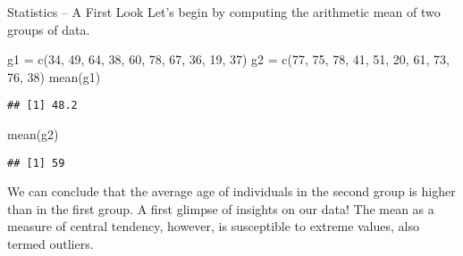 \documentclass[
  ignorenonframetext,
]{beamer}
\newenvironment{Shaded}{\begin{snugshade}}{\end{snugshade}}
\newcommand{\DecValTok}[1]{\textcolor[rgb]{0.00,0.00,0.81}{#1}}
\newcommand{\FunctionTok}[1]{\textcolor[rgb]{0.00,0.00,0.00}{#1}}
\newcommand{\NormalTok}[1]{#1}
\newcommand{\OtherTok}[1]{\textcolor[rgb]{0.56,0.35,0.01}{#1}}
\begin{document}
\begin{frame}[fragile]{Statistics -- A First Look}
\protect\hypertarget{statistics-a-first-look}{}
Let's begin by computing the arithmetic mean of two groups of data.

\begin{Shaded}
\begin{Highlighting}[]
\NormalTok{g1 }\OtherTok{=} \FunctionTok{c}\NormalTok{(}\DecValTok{34}\NormalTok{, }\DecValTok{49}\NormalTok{, }\DecValTok{64}\NormalTok{, }\DecValTok{38}\NormalTok{, }\DecValTok{60}\NormalTok{, }\DecValTok{78}\NormalTok{, }\DecValTok{67}\NormalTok{, }\DecValTok{36}\NormalTok{, }\DecValTok{19}\NormalTok{, }\DecValTok{37}\NormalTok{) }
\NormalTok{g2 }\OtherTok{=} \FunctionTok{c}\NormalTok{(}\DecValTok{77}\NormalTok{, }\DecValTok{75}\NormalTok{, }\DecValTok{78}\NormalTok{, }\DecValTok{41}\NormalTok{, }\DecValTok{51}\NormalTok{, }\DecValTok{20}\NormalTok{, }\DecValTok{61}\NormalTok{, }\DecValTok{73}\NormalTok{, }\DecValTok{76}\NormalTok{, }\DecValTok{38}\NormalTok{) }
\FunctionTok{mean}\NormalTok{(g1) }
\end{Highlighting}
\end{Shaded}

\begin{verbatim}
## [1] 48.2
\end{verbatim}

\begin{Shaded}
\begin{Highlighting}[]
\FunctionTok{mean}\NormalTok{(g2)}
\end{Highlighting}
\end{Shaded}

\begin{verbatim}
## [1] 59
\end{verbatim}

We can conclude that the average age of individuals in the second group
is higher than in the first group. A first glimpse of insights on our
data! The mean as a measure of central tendency, however, is susceptible
to extreme values, also termed outliers.
\end{frame}
\end{document}
